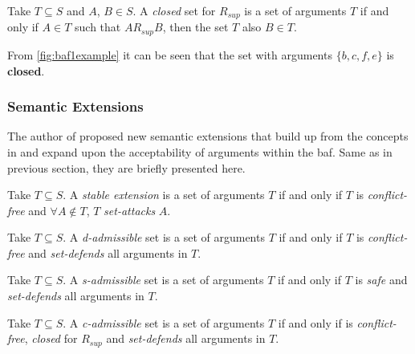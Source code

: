             \begin{definition}
                Take $T \subseteq S$ and $A$, $B \in S$. A \textit{closed} set for $R_{sup}$ is a set of arguments $T$ if and only if $A \in T$ such that $A R_{sup} B$, then the set $T$ also $B \in T$.
                \label{definition:definition18}
            \end{definition}
            \begin{exa}
                From \autoref{fig:baf1example} it can be seen that the set with arguments $\{b, c, f, e\}$ is \textbf{closed}.
                \label{exa:example16}
            \end{exa}
            
        \subsubsection{Semantic Extensions}
            The author of \autocite{Cayrol2005OnTA} proposed new semantic extensions that build up from the concepts in \autocite{Dung1995OnTA} and expand upon the acceptability of arguments within the \gls{baf}. Same as in previous section, they are briefly presented here.
            
            \begin{definition}
                Take $T \subseteq S$. A \textit{stable extension} is a set of arguments $T$ if and only if $T$ is \textit{conflict-free} and $\forall A \notin T$, $T$ \textit{set-attacks} $A$.
                \label{definition:definition19}
            \end{definition}
            
            \begin{definition}
                Take $T \subseteq S$. A \textit{d-admissible} set is a set of arguments $T$ if and only if $T$ is \textit{conflict-free} and \textit{set-defends} all arguments in $T$.
                \label{definition:definition20}
            \end{definition}
            
            \begin{definition}
                Take $T \subseteq S$. A \textit{s-admissible} set is a set of arguments $T$ if and only if $T$ is \textit{safe} and \textit{set-defends} all arguments in $T$.
                \label{definition:definition21}
            \end{definition}
            
            \begin{definition}
                Take $T \subseteq S$. A \textit{c-admissible} set is a set of arguments $T$ if and only if is \textit{conflict-free}, \textit{closed} for $R_{sup}$ and \textit{set-defends} all arguments in $T$.
                \label{definition:definition22}
            \end{definition}
            

